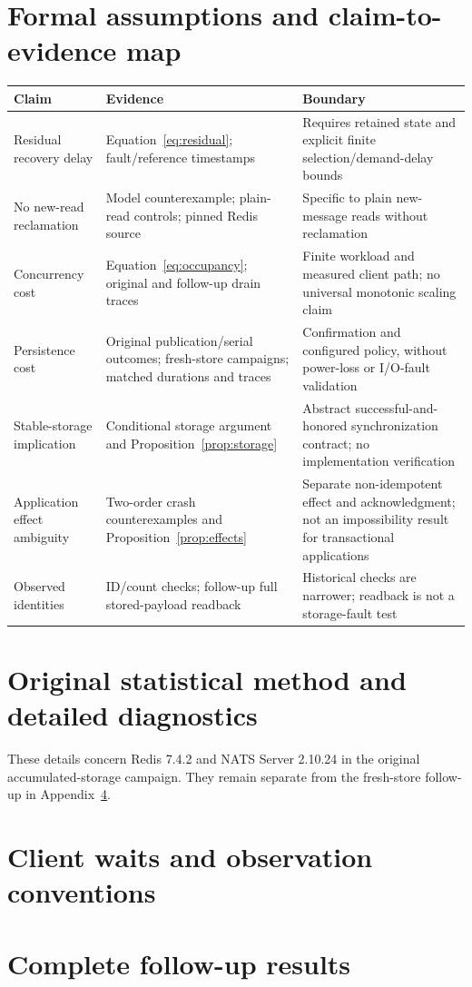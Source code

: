 \documentclass[11pt]{article}
\theoremstyle{definition}
\begin{document}
\section{Formal assumptions and claim-to-evidence map}\label{app:evidence}
\begin{longtable}{L{.20\linewidth}L{.33\linewidth}L{.36\linewidth}}
\toprule
Claim & Evidence & Boundary\\
\midrule\endhead
Residual recovery delay & Equation~\ref{eq:residual}; fault/reference timestamps & Requires retained state and explicit finite selection/demand-delay bounds\\
No new-read reclamation & Model counterexample; plain-read controls; pinned Redis source & Specific to plain new-message reads without reclamation\\
Concurrency cost & Equation~\ref{eq:occupancy}; original and follow-up drain traces & Finite workload and measured client path; no universal monotonic scaling claim\\
Persistence cost & Original publication/serial outcomes; fresh-store campaigns; matched durations and traces & Confirmation and configured policy, without power-loss or I/O-fault validation\\
Stable-storage implication & Conditional storage argument and Proposition~\ref{prop:storage} & Abstract successful-and-honored synchronization contract; no implementation verification\\
Application effect ambiguity & Two-order crash counterexamples and Proposition~\ref{prop:effects} & Separate non-idempotent effect and acknowledgment; not an impossibility result for transactional applications\\
Observed identities & ID/count checks; follow-up full stored-payload readback & Historical checks are narrower; readback is not a storage-fault test\\
\bottomrule
\end{longtable}

\FloatBarrier

\FloatBarrier

\section{Original statistical method and detailed diagnostics}\label{app:history}
These details concern Redis 7.4.2 and NATS Server 2.10.24 in the original accumulated-storage campaign. They remain separate from the fresh-store follow-up in Appendix~\ref{app:followup}.

\FloatBarrier

\section{Client waits and observation conventions}\label{sec:client-waits}


\section{Complete follow-up results}\label{app:followup}


\clearpage
\begingroup\raggedright


\endgroup
\end{document}
